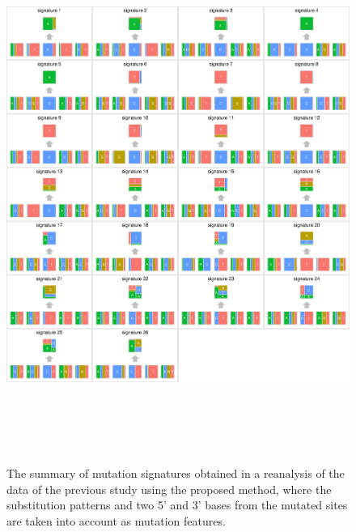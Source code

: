 \begin{figure}[b]
\centering
\includegraphics[width=16cm,height=17.5cm]{AlexandrovEtAl_mergedSignature.eps}
\caption{The summary of mutation signatures obtained in a reanalysis of the data of the previous study \cite{pmid23945592} using the proposed method,
where the substitution patterns and two 5' and 3' bases from the mutated sites are taken into account as mutation features.
}
\label{nature2013_sig_summary}
\end{figure}

\clearpage

